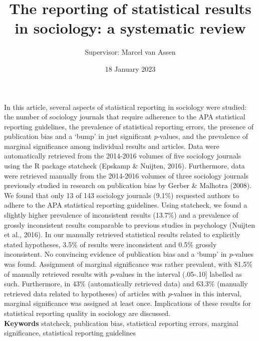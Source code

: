 \documentclass[
  12pt,
]{article}
\title{The reporting of statistical results in sociology: a systematic review}
\author{Supervisor: Marcel van Assen}
\date{18 January 2023}
\begin{document}
\maketitle

\pagebreak

In this article, several aspects of statistical reporting in sociology
were studied: the number of sociology journals that require adherence to
the APA statistical reporting guidelines, the prevalence of statistical
reporting errors, the presence of publication bias and a `bump' in just
significant \emph{p}-values, and the prevalence of marginal significance
among individual results and articles. Data were automatically retrieved
from the 2014-2016 volumes of five sociology journals using the R
package statcheck (Epskamp \& Nuijten, 2016). Furthermore, data were
retrieved manually from the 2014-2016 volumes of three sociology
journals previously studied in research on publication bias by Gerber \&
Malhotra (2008). We found that only 13 of 143 sociology journals (9.1\%)
requested authors to adhere to the APA statistical reporting guidelines.
Using statcheck, we found a slightly higher prevalence of inconsistent
results (13.7\%) and a prevalence of grossly inconsistent results
comparable to previous studies in psychology (Nuijten et al., 2016). In
our manually retrieved statistical results related to explicitly stated
hypotheses, 3.5\% of results were inconsistent and 0.5\% grossly
inconsistent. No convincing evidence of publication bias and a `bump' in
\emph{p}-values was found. Assignment of marginal significance was
rather prevalent, with 81.5\% of manually retrieved results with
\emph{p}-values in the interval (.05-.10{]} labelled as such.
Furthermore, in 43\% (automatically retrieved data) and 63.3\% (manually
retrieved data related to hypotheses) of articles with \emph{p}-values
in this interval, marginal significance was assigned at least once.
Implications of these results for statistical reporting quality in
sociology are discussed. \\

\textbf{Keywords} statcheck, publication bias, statistical reporting
errors, marginal significance, statistical reporting guidelines
\pagebreak
\end{document}
